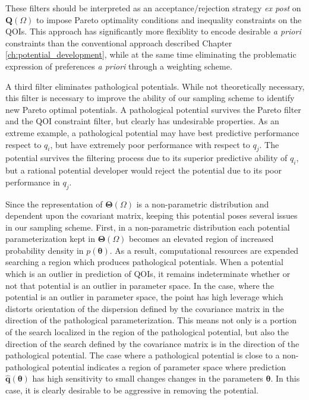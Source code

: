 These filters should be interpreted as an acceptance/rejection strategy \emph{ex post} on $\bm{Q}(\Omega)$ to impose Pareto optimality conditions and inequality constraints on the QOIs.  This approach has significantly more flexiblity to encode desirable \emph{a priori} constraints than the conventional approach described Chapter \ref{ch:potential_development}, while at the same time eliminating the problematic expression of preferences \emph{a priori} through a weighting scheme.

A third filter eliminates pathological potentials.  While not theoretically necessary, this filter is necessary to improve the ability of our sampling scheme to identify new Pareto optimal potentials.  A pathological potential survives the Pareto filter and the QOI constraint filter, but clearly has undesirable properties.  As an extreme example, a pathological potential may have best predictive performance respect to $q_i$, but have extremely poor performance with respect to $q_j$.  The potential survives the filtering process due to its superior predictive ability of $q_i$, but a rational potential developer would reject the potential due to its poor performance in $q_j$.

  Since the representation of $\bm{\Theta}(\Omega)$ is a non-parametric distribution and dependent upon the covariant matrix, keeping this potential poses several issues in our sampling scheme.  First, in a non-parametric distribution each potential parameterization kept in $\bm{\Theta}(\Omega)$ becomes an elevated region of increased probability density in $p(\bm{\theta})$.  As a result, computational resources are expended searching a region which produces pathological potentials.  When a potential which is an outlier in prediction of QOIs, it remains indeterminate whether or not that potential is an outlier in parameter space.  In the case, where the potential is an outlier in parameter space, the point has high leverage which distorts orientation of the dispersion defined by the covariance matrix in the direction of the pathological parameterization.  This means not only is a portion of the search localized in the region of the pathological potential, but also the direction of the search defined by the covariance matrix is in the direction of the pathological potential.  The case where a pathological potential is close to a non-pathological potential indicates a region of parameter space where prediction $\hat{\bm{q}}(\bm{\theta})$ has high sensitivity to small changes changes in the parameters $\bm{\theta}$.  In this case, it is clearly desirable to be aggressive in removing the potential.

